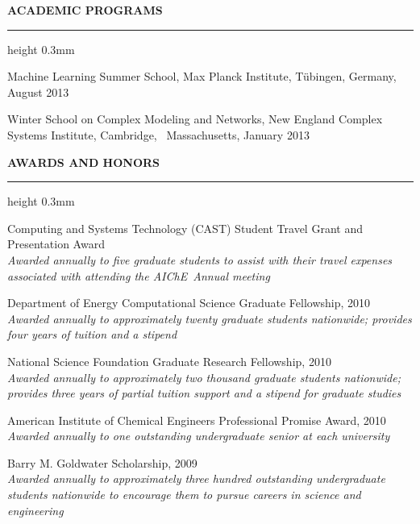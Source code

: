 \documentclass[letterpaper,10pt]{article}
\newenvironment{itemize*}
  {\begin{itemize}
    \setlength{\parskip}{-2pt}}
  {\end{itemize}}
\newcommand{\cvheading}[1]{
\vspace{0.11in}
\noindent
\MakeUppercase{\bf #1}
\vspace{0.05in}
{\hrule height 0.3mm}
\vspace{0.05in}}
\begin{document}
\cvheading{Academic Programs}
\begin{itemize*}
\item Machine Learning Summer School, Max Planck Institute, T\"{u}bingen, Germany, August 2013
\item Winter School on Complex Modeling and Networks, New England Complex Systems Institute, Cambridge,~ Massachusetts, January 2013
\end{itemize*}



\cvheading{Awards and Honors}
\noindent
\begin{itemize*}
\item Computing and Systems Technology (CAST) Student Travel Grant and Presentation Award \\
{\em \small Awarded annually to five graduate students to assist with their travel expenses associated with attending the AIChE~Annual meeting}
\item Department of Energy Computational Science Graduate Fellowship, 2010 \\
    {\em \small Awarded annually to approximately twenty graduate students nationwide; provides four years of tuition and a stipend}
\item National Science Foundation Graduate Research Fellowship, 2010\\
    {\em \small Awarded annually to approximately two thousand graduate students nationwide; provides three years of partial tuition support and a stipend for graduate studies}
\item American Institute of Chemical Engineers Professional Promise Award, 2010\\
    {\em \small Awarded annually to one outstanding undergraduate senior at each university}
\item Barry M. Goldwater Scholarship, 2009\\
    {\em \small Awarded annually to approximately three hundred outstanding undergraduate students nationwide to encourage them to pursue careers in science and engineering}
\end{itemize*}
\end{document}
